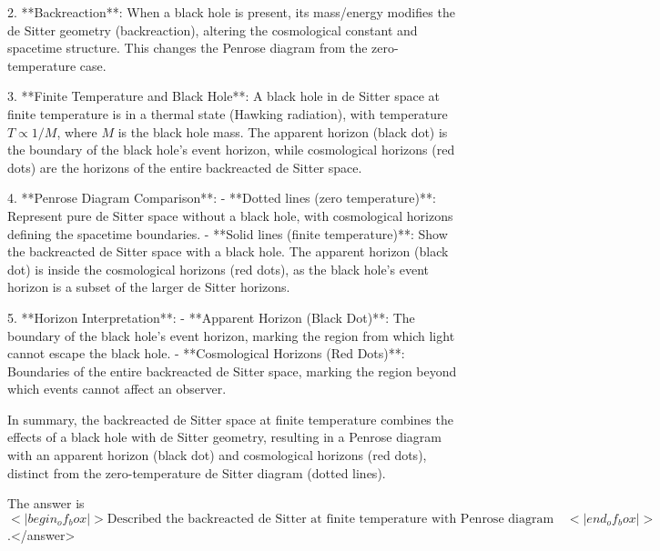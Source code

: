 2. **Backreaction**: When a black hole is present, its mass/energy modifies the de Sitter geometry (backreaction), altering the cosmological constant and spacetime structure. This changes the Penrose diagram from the zero-temperature case.  

3. **Finite Temperature and Black Hole**: A black hole in de Sitter space at finite temperature is in a thermal state (Hawking radiation), with temperature \(T \propto 1/M\), where \(M\) is the black hole mass. The apparent horizon (black dot) is the boundary of the black hole’s event horizon, while cosmological horizons (red dots) are the horizons of the entire backreacted de Sitter space.  

4. **Penrose Diagram Comparison**:  
   - **Dotted lines (zero temperature)**: Represent pure de Sitter space without a black hole, with cosmological horizons defining the spacetime boundaries.  
   - **Solid lines (finite temperature)**: Show the backreacted de Sitter space with a black hole. The apparent horizon (black dot) is inside the cosmological horizons (red dots), as the black hole’s event horizon is a subset of the larger de Sitter horizons.  

5. **Horizon Interpretation**:  
   - **Apparent Horizon (Black Dot)**: The boundary of the black hole’s event horizon, marking the region from which light cannot escape the black hole.  
   - **Cosmological Horizons (Red Dots)**: Boundaries of the entire backreacted de Sitter space, marking the region beyond which events cannot affect an observer.  

In summary, the backreacted de Sitter space at finite temperature combines the effects of a black hole with de Sitter geometry, resulting in a Penrose diagram with an apparent horizon (black dot) and cosmological horizons (red dots), distinct from the zero-temperature de Sitter diagram (dotted lines).  

The answer is \(<|begin_of_box|>\text{Described the backreacted de Sitter at finite temperature with Penrose diagram elements as outlined}<|end_of_box|>\).</answer>